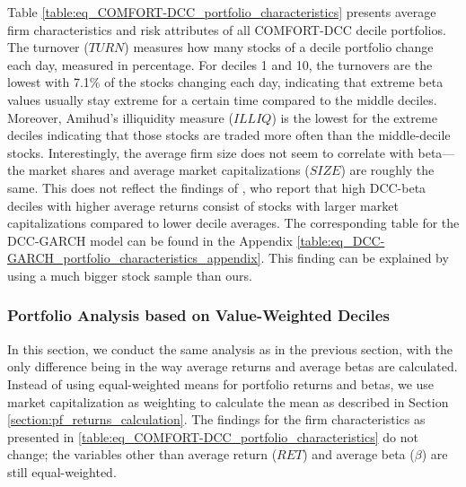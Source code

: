 \documentclass[11pt,a4paper]{article}
\begin{document}
Table \ref{table:eq_COMFORT-DCC_portfolio_characteristics} presents average firm characteristics and risk attributes of all COMFORT-DCC decile portfolios. The turnover ($\textit{TURN}$) measures how many stocks of a decile portfolio change each day, measured in percentage. For deciles 1 and 10, the turnovers are the lowest with 7.1\% of the stocks changing each day, indicating that extreme beta values usually stay extreme for a certain time compared to the middle deciles. Moreover, Amihud's illiquidity measure ($\textit{ILLIQ}$) is the lowest for the extreme deciles indicating that those stocks are traded more often than the middle-decile stocks. Interestingly, the average firm size does not seem to correlate with beta---the market shares and average market capitalizations ($\textit{SIZE}$) are roughly the same. This does not reflect the findings of , who report that high DCC-beta deciles with higher average returns consist of stocks with larger market capitalizations compared to lower decile averages. The corresponding table for the DCC-GARCH model can be found in the Appendix \ref{table:eq_DCC-GARCH_portfolio_characteristics_appendix}. This finding can be explained by  using a much bigger stock sample than ours.





\subsubsection{Portfolio Analysis based on Value-Weighted Deciles}

In this section, we conduct the same analysis as in the previous section, with the only difference being in the way average returns and average betas are calculated. Instead of using equal-weighted means for portfolio returns and betas, we use market capitalization as weighting to calculate the mean as described in Section \ref{section:pf_returns_calculation}. The findings for the firm characteristics as presented in \ref{table:eq_COMFORT-DCC_portfolio_characteristics} do not change; the variables other than average return ($\textit{RET}$) and average beta ($\beta$) are still equal-weighted. \\
\end{document}
